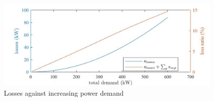 \begin{figure}\centering
	\includegraphics{_chapter1/fig/losses-against-network-demand}
	\caption{Losses against increasing power demand}
	\label{ch1:fig:losses-against-network-demand}
\end{figure}